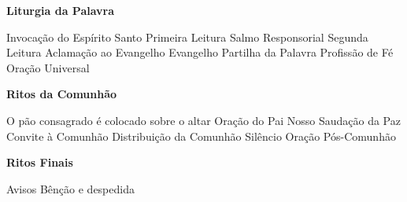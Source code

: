 \documentclass{book}
\begin{document}
\begin{center}
    \textbf{Liturgia da Palavra}
\end{center}
\begin{flushleft}
    Invocação do Espírito Santo
    Primeira Leitura
    Salmo Responsorial
    Segunda Leitura
    Aclamação ao Evangelho
    Evangelho
    Partilha da Palavra
    Profissão de Fé
    Oração Universal
\end{flushleft}
\begin{center}
    \textbf{Ritos da Comunhão}
\end{center}
\begin{flushleft}
    O pão consagrado é colocado sobre o altar
    Oração do Pai Nosso
    Saudação da Paz
    Convite à Comunhão
    Distribuição da Comunhão
    Silêncio
    Oração Pós-Comunhão
\end{flushleft}
\begin{center}
    \textbf{Ritos Finais}
\end{center}
\begin{flushleft}
    Avisos
    Bênção e despedida
\end{flushleft}
\end{document}
